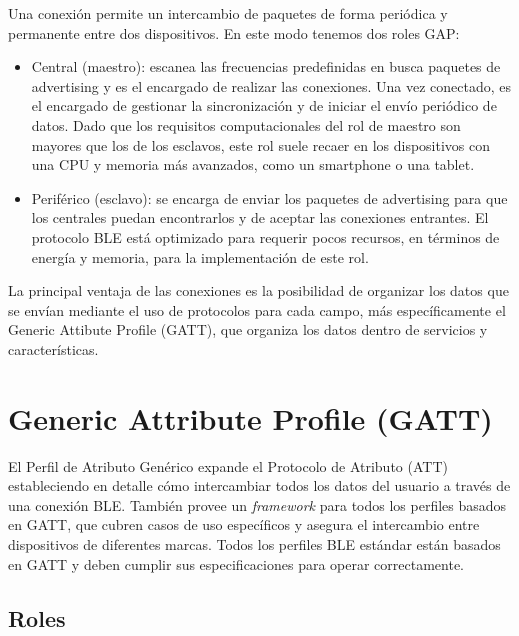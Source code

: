 Una conexión permite un intercambio de paquetes de forma periódica y permanente entre dos dispositivos. En este modo tenemos dos roles GAP:

\begin{itemize}
	\item Central (maestro): escanea las frecuencias predefinidas en busca paquetes de advertising y es el encargado de realizar las conexiones. Una vez conectado, es el encargado de gestionar la sincronización y de iniciar el envío periódico de datos. Dado que los requisitos computacionales del rol de maestro son mayores que los de los esclavos, este rol suele recaer en los dispositivos con una CPU y memoria más avanzados, como un smartphone o una tablet.

	\item Periférico (esclavo): se encarga de enviar los paquetes de advertising para que los centrales puedan encontrarlos y de aceptar las conexiones entrantes. El protocolo BLE está optimizado para requerir pocos recursos, en términos de energía y memoria, para la implementación de este rol.
\end{itemize}

La principal ventaja de las conexiones es la posibilidad de organizar los datos que se envían mediante el uso de protocolos para cada campo, más específicamente el Generic Attibute Profile (GATT), que organiza los datos dentro de servicios y características.

\section{Generic Attribute Profile (GATT)}
\label{makereference2.4}

El Perfil de Atributo Genérico expande el Protocolo de Atributo (ATT) estableciendo en detalle cómo intercambiar todos los datos del usuario a través de una conexión BLE. También provee un \textit{framework} para todos los perfiles basados en GATT, que cubren casos de uso específicos y asegura el intercambio entre dispositivos de diferentes marcas. Todos los perfiles BLE estándar están basados en GATT y deben cumplir sus especificaciones para operar correctamente.

\subsection{Roles}
\label{makereference2.4.2}

